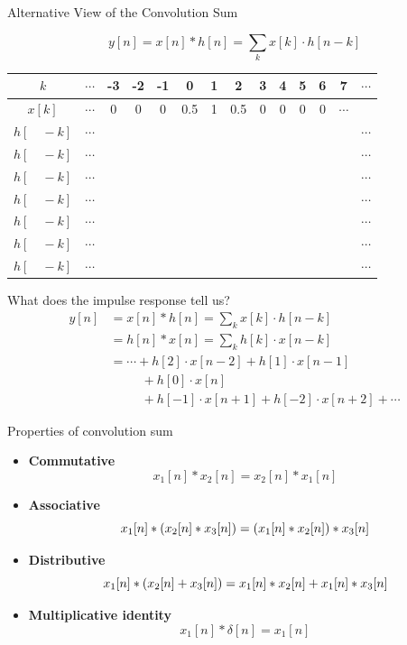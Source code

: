 \documentclass[aspectratio=169]{beamer}
\let\olditem\item
\renewcommand{\item}{\setlength{\itemsep}{\fill}\olditem}
\def\lp{\ensuremath\left(}
\def\rp{\ensuremath\right)}
\begin{document}
\begin{frame}[t]{Alternative View of the Convolution Sum}
\begin{Large}
\[ y[n] = x[n] * h[n] = \sum_k x[k] \cdot h[n - k] \]
\end{Large}
\begin{center}
\begin{tabu}{c|c|c|c|c|c|c|c|c|c|c|c|c|c}
\hline
$k$ & $\cdots$ & -3 &  -2 & -1 & 0 & 1 & 2 & 3 & 4 & 5 & 6 & 7 & $\cdots$ \\ \hline
\rowfont{\color{red}} $x[k]$ & $\cdots$ & 0 & 0 & 0 & 0.5 & 1 & 0.5 & 0 & 0 & 0 & 0 & $\cdots$ &  \\ \hline
$h[\quad - k]$ & $\cdots$ &  &  &  &  &  &  &  &  &  &  &  & $\cdots$ \\ \hline
$h[\quad - k]$ & $\cdots$ &  &  &  &  &  &  &  &  &  &  &  & $\cdots$ \\ \hline
$h[\quad - k]$ & $\cdots$ &  &  &  &  &  &  &  &  &  &  &  & $\cdots$ \\ \hline
$h[\quad - k]$ & $\cdots$ &  &  &  &  &  &  &  &  &  &  &  & $\cdots$ \\ \hline
$h[\quad - k]$ & $\cdots$ &  &  &  &  &  &  &  &  &  &  &  & $\cdots$ \\ \hline
$h[\quad - k]$ & $\cdots$ &  &  &  &  &  &  &  &  &  &  &  & $\cdots$ \\ \hline
$h[\quad - k]$ & $\cdots$ &  &  &  &  &  &  &  &  &  &  &  & $\cdots$ \\ \hline
\end{tabu}
\end{center}
\end{frame}

\begin{frame}[t]{What does the impulse response tell us?}
\[
\begin{split}
y[n] &= x[n] * h[n] = \sum_k x[k] \cdot h[n - k] \\
     &= h[n] * x[n] = \sum_k h[k] \cdot x[n - k] \\
     &= \cdots + h[2] \cdot x[n-2] + h[1] \cdot x[n-1] \\
     &\quad \quad \,\,\, + h[0] \cdot x[n]\\
     &\quad \quad \,\,\, + h[-1] \cdot x[n + 1] + h[-2] \cdot x[n + 2] + \cdots
\end{split}
\]
\end{frame}

\begin{frame}[t]{Properties of convolution sum}
\begin{itemize}
  \item \textbf{Commutative}
  \[ x_1[n] * x_2[n] = x_2[n] * x_1[n] \]
  \item \textbf{Associative}
  \[ x_1[n] * \lp x_2[n] * x_3[n]\rp = \lp x_1[n] * x_2[n]\rp * x_3[n] \]
  \item \textbf{Distributive}
  \[ x_1[n] * \lp x_2[n] + x_3[n]\rp = x_1[n] * x_2[n] + x_1[n] * x_3[n] \]
  \item \textbf{Multiplicative identity}
  \[ x_1[n] * \delta[n] = x_1[n] \]
\end{itemize}
\end{frame}
\end{document}
